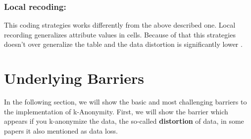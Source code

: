 \documentclass{llncs}
\begin{document}
\subsubsection{Local recoding:}
This coding strategies works differently from the above described one. Local recording generalizes attribute values in cells. Because of that this strategies doesn't over generalize the table and the data distortion is significantly lower \cite{li2006achieving}. 

 
\section{Underlying Barriers}

In the following section, we will show the basic and most challenging barriers to the implementation of k-Anonymity. First, we will show the barrier which appears if you k-anonymize the data, the so-called \textbf{distortion} of data, in some papers it also mentioned as data loss. 
\end{document}

